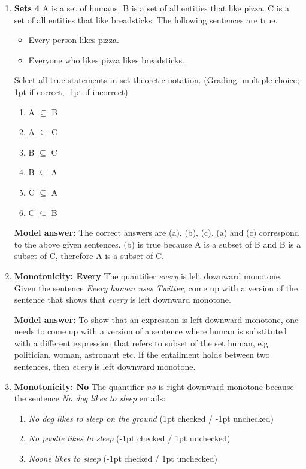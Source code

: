 \documentclass[a4,11pt]{article}
\begin{document}
\begin{enumerate}[leftmargin = 12pt]
\item {\bf Sets 4}  A is a set of humans. B is a set of all entities that like pizza. C is a set of all entities that like breadsticks.  The following sentences are true. 

\begin{itemize}[noitemsep]
\item Every person likes pizza.
\item Everyone who likes pizza likes breadsticks.
\end{itemize}

Select all true statements in set-theoretic notation. (Grading: multiple choice; 1pt if correct, -1pt if incorrect)

\begin{enumerate}
\item A $\subseteq$ B
\item A $\subseteq$ C
\item B $\subseteq$ C
\item B $\subseteq$ A
\item C $\subseteq$ A
\item C $\subseteq$ B
\end{enumerate}

{\bf Model answer:} The correct answers are (a), (b), (c). (a) and (c) correspond to the above given sentences. (b) is true because A is a subset of B and B is a subset of C, therefore A is a subset of C.

\item {\bf Monotonicity: Every} The quantifier \textit{every} is left downward monotone. Given the sentence \textit{Every human uses Twitter}, come up with a version of the sentence that shows that  \textit{every} is left downward monotone.
	
{\bf Model answer:} To show that an expression is left downward monotone, one needs to come up with a version of a sentence where human is substituted with a different expression that refers to subset of the set human, e.g. politician, woman, astronaut etc. If the entailment holds between two sentences, then  \textit{every} is left downward monotone.


\item {\bf Monotonicity: No} The quantifier \textit{no} is right downward monotone because the sentence \textit{No dog likes to sleep} entails:

      \begin{enumerate}[noitemsep]
        \item \textit{No dog likes to sleep on the ground} (1pt checked / -1pt unchecked)
	\item \textit{No poodle likes to sleep} (-1pt checked / 1pt unchecked)
        \item \textit{Noone likes to sleep} (-1pt checked / 1pt unchecked)
	\end{enumerate}	


\end{enumerate}
\end{document}
